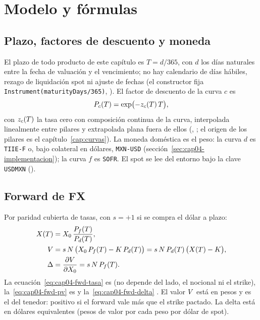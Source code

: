 \section{Modelo y fórmulas}\label{sec:cap04-modelo}

\subsection{Plazo, factores de descuento y moneda}\label{sec:cap04-tiempo}

El plazo de todo producto de este capítulo es $T=d/365$, con $d$ los días naturales entre la fecha de
valuación y el vencimiento; no hay calendario de días hábiles, rezago de liquidación spot ni ajuste de fechas
(el constructor fija \texttt{Instrument(maturityDays/365)},
). El factor de descuento de la curva $c$ es
\begin{equation}\label{eq:cap04-df}
  P_{c}(T) = \exp\bigl(-z_{c}(T)\,T\bigr),
\end{equation}
con $z_{c}(T)$ la tasa cero con composición continua de la curva, interpolada linealmente entre pilares y
extrapolada plana fuera de ellos (,
; el origen de los pilares es el
capítulo~\ref{cap:curvas}). La moneda doméstica es el peso: la curva $d$ es \texttt{TIIE-F} o, bajo colateral
en dólares, \texttt{MXN-USD} (sección~\ref{sec:cap04-implementacion}); la curva $f$ es \texttt{SOFR}. El spot
se lee del entorno bajo la clave \texttt{USDMXN}
().

\subsection{Forward de FX}\label{sec:cap04-forward}

Por paridad cubierta de tasas, con $s=+1$ si se compra el dólar a plazo:
\begin{align}
  X(T) &= X_0\,\frac{P_{f}(T)}{P_{d}(T)}, \label{eq:cap04-fwd-tasa}\\
  V &= s\,N\,\bigl(X_0\,P_{f}(T) - K\,P_{d}(T)\bigr) = s\,N\,P_{d}(T)\,\bigl(X(T)-K\bigr),
        \label{eq:cap04-fwd-pv}\\
  \Delta &= \frac{\partial V}{\partial X_0} = s\,N\,P_{f}(T). \label{eq:cap04-fwd-delta}
\end{align}
La ecuación~\eqref{eq:cap04-fwd-tasa} es  (no
depende del lado, el nocional ni el strike), la~\eqref{eq:cap04-fwd-pv} es
 y la~\eqref{eq:cap04-fwd-delta}
. El valor $V$ está en pesos y es el del tenedor:
positivo si el forward vale más que el strike pactado. La delta está en dólares equivalentes (pesos de valor por cada peso por dólar
de spot).

